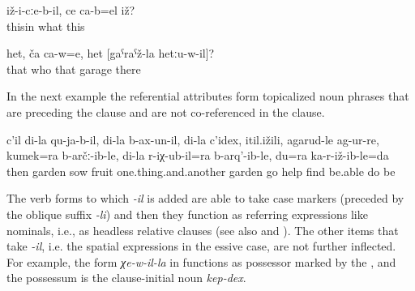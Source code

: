 \begin{exe}
	\ex	\label{ex:‎This in it (i.e. his hand), what is it minor}
	\gll	iž-i-cːe-b-il,	ce	ca-b=el	iž?\\
		thisin	what		this\\
	\glt	{}
	
	\ex	\label{ex:He, who is it, the one of the garage there minor}
	\gll	het,	ča 	ca-w=e,	het	[gaˁraˁž-la	hetːu-w-il]?\\
		that	who		that	garage	there\\
	\glt	{}
	
\end{exe}

In the next example  the referential attributes form topicalized noun phrases that are preceding the clause and are not co-referenced in the clause.

\begin{exe}
	\ex	\label{ex:‎Then, for my fields, my sown fields, my fruits, all the stuff, I went to the garden, I found help}
	\gll	c'il	di-la	qu-ja-b-il,	di-la	b-ax-un-il,	di-la	c'idex,	itil.ižili,	agarud-le ag-ur-re, kumek=ra	b-arčː-ib-le,	di-la	r-iχ-ub-il=ra	b-arq'-ib-le,	du=ra	ka-r-iž-ib-le=da\\
		then		garden		sow		fruit		one.thing.and.another	garden	go\tsc{.pfv-pret-cvb}	help	find		be.able	do		be\\
	\glt	{}
\end{exe}
%

The verb forms to which \textit{-il} is added are able to take case markers (preceded by the oblique suffix \textit{-li}) and then they function as referring expressions like nominals, i.e., as headless relative clauses  (see also  and ). The other items that take \textit{-il}, i.e. the spatial expressions in the essive case, are not further inflected. For example, the form \textit{χe-w-il-la} in  functions as possessor marked by the , and the possessum is the clause-initial noun \textit{kep-dex}.


